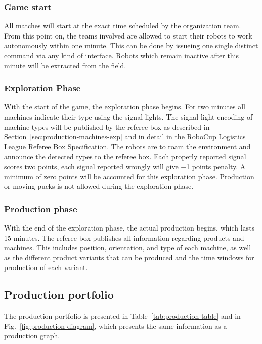 \documentclass[12pt,twoside]{article}
\newcommand{\refsec}[1]{Section~\ref{#1}}
\begin{document}
\subsubsection{Game start} \label{sec:game-start}
All matches will start at the exact time scheduled by the organization
team. From this point on, the teams involved are allowed to start their
robots to work autonomously within one minute. This can be done by
issueing one single distinct command via any kind of interface. Robots
which remain inactive after this minute will be extracted from the field.

\subsubsection{Exploration Phase} \label{sec:expphase} 
With the start of the game, the exploration phase begins. For two
minutes all machines indicate their type using the signal lights. The
signal light encoding of machine types will be published by the referee box
as described in \refsec{sec:production-machines-exp} and in detail in
the RoboCup Logistics League Referee Box Specification. The robots are
to roam the environment and announce the detected types to the referee box.
Each properly reported signal scores two points, each signal reported
wrongly will give \num{-1} points penalty. A minimum of zero points
will be accounted for this exploration phase. Production or moving
pucks is not allowed during the exploration phase.


\subsubsection{Production phase}
\label{sec:production-phase}

With the end of the exploration phase, the actual production begins,
which lasts \num{15} minutes. The referee box publishes all information
regarding products and machines. This includes position, orientation,
and type of each machine, as well as the different product variants
that can be produced and the time windows for production of each
variant. 


\subsection{Production portfolio}
\label{sec:prodportfolio}

The production portfolio is presented in
Table~\ref{tab:production-table} and in
Fig.~\ref{fig:production-diagram}, which presents the same information
as a production graph.
\end{document}
